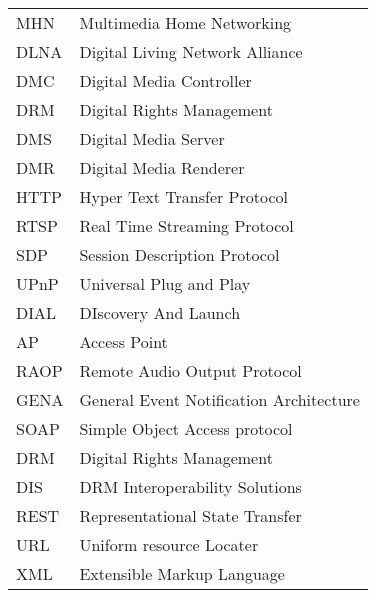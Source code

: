 



\begin{tabular}{ll}
MHN	   & Multimedia Home Networking \\
DLNA       & Digital Living Network Alliance\label{dlna_shortfor} \\ 
DMC        & Digital Media Controller \\
DRM        & Digital Rights Management \\ 
DMS        & Digital Media Server \\
DMR        & Digital Media Renderer \\
HTTP       & Hyper Text Transfer Protocol \\
RTSP       & Real Time Streaming Protocol \\
SDP    	& Session Description Protocol\\ 
UPnP	   & Universal Plug and Play \label{upnp_shortfor} \\
DIAL	   & DIscovery And Launch \label{dial_shortfor} \\
AP	   & Access Point \\
RAOP	   & Remote Audio Output Protocol\\
GENA		& General Event Notification Architecture\\
SOAP		& Simple Object Access protocol\\
DRM		& Digital Rights Management\\
DIS		& DRM Interoperability Solutions\\
REST		& Representational State Transfer\\
URL		& Uniform resource Locater \\
XML		& Extensible Markup Language \\
\end{tabular}
